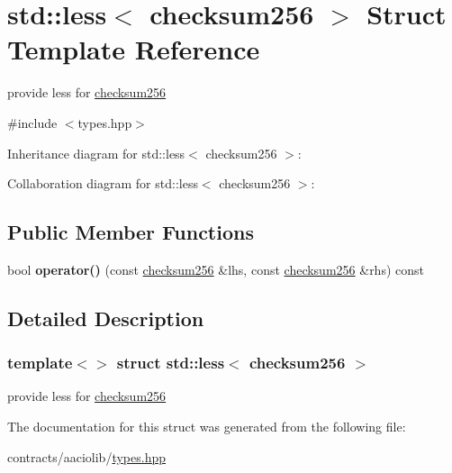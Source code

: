 \hypertarget{structstd_1_1less_3_01checksum256_01_4}{}\section{std\+:\+:less$<$ checksum256 $>$ Struct Template Reference}
\label{structstd_1_1less_3_01checksum256_01_4}


provide less for \mbox{\hyperlink{structchecksum256}{checksum256}}  




{\ttfamily \#include $<$types.\+hpp$>$}



Inheritance diagram for std\+:\+:less$<$ checksum256 $>$\+:


Collaboration diagram for std\+:\+:less$<$ checksum256 $>$\+:
\subsection*{Public Member Functions}
\begin{DoxyCompactItemize}
\item 
\mbox{\label{structstd_1_1less_3_01checksum256_01_4_ab4b4d3d4e3816c907dc0557df6c815ae}} 
bool {\bfseries operator()} (const \mbox{\hyperlink{structchecksum256}{checksum256}} \&lhs, const \mbox{\hyperlink{structchecksum256}{checksum256}} \&rhs) const
\end{DoxyCompactItemize}


\subsection{Detailed Description}
\subsubsection*{template$<$$>$\newline
struct std\+::less$<$ checksum256 $>$}

provide less for \mbox{\hyperlink{structchecksum256}{checksum256}} 

The documentation for this struct was generated from the following file\+:\begin{DoxyCompactItemize}
\item 
contracts/aaciolib/\mbox{\hyperlink{contracts_2aaciolib_2types_8hpp}{types.\+hpp}}\end{DoxyCompactItemize}
